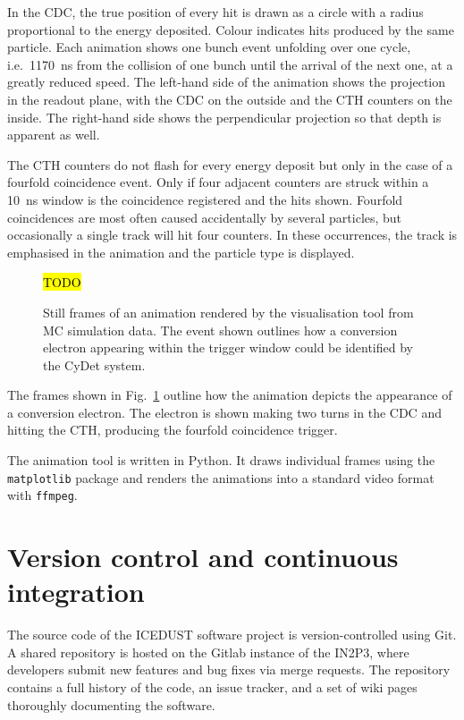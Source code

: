In the CDC, the true position of every hit is drawn as a circle with a radius proportional to the energy deposited. Colour indicates hits produced by the same particle. Each animation shows one bunch event unfolding over one cycle, i.e.\ \SI{1170}{\ns} from the collision of one bunch until the arrival of the next one, at a greatly reduced speed.
The left-hand side of the animation shows the projection in the readout plane, with the CDC on the outside and the CTH counters on the inside. The right-hand side shows the perpendicular projection so that depth is apparent as well.

The CTH counters do not flash for every energy deposit but only in the case of a fourfold coincidence event. Only if four adjacent counters are struck within a \SI{10}{\ns} window is the coincidence registered and the hits shown. Fourfold coincidences are most often caused accidentally by several particles, but occasionally a single track will hit four counters. In these occurrences, the track is emphasised in the animation and the particle type is displayed.

\begin{figure}
    \centering
    \hl{TODO}
    \caption{Still frames of an animation rendered by the visualisation tool from MC simulation data. The event shown outlines how a conversion electron appearing within the trigger window could be identified by the CyDet system.}
    \label{fig:animation}
\end{figure}

The frames shown in Fig.~\ref{fig:animation} outline how the animation depicts the appearance of a conversion electron. The electron is shown making two turns in the CDC and hitting the CTH, producing the fourfold coincidence trigger.

The animation tool is written in Python. It draws individual frames using the \texttt{matplotlib} package and renders the animations into a standard video format with \texttt{ffmpeg}. 


\section{Version control and continuous integration}

The source code of the ICEDUST software project is version-controlled using Git. A shared repository is hosted on the Gitlab instance of the IN2P3, where developers submit new features and bug fixes via merge requests. The repository contains a full history of the code, an issue tracker, and a set of wiki pages thoroughly documenting the software.

